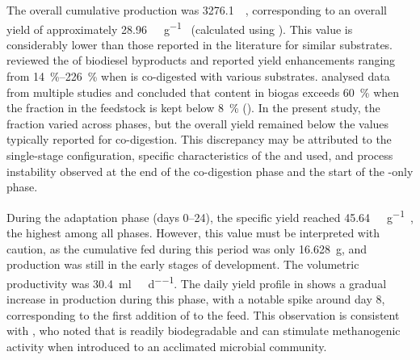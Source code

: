 \documentclass[12pt, a4paper, oneside]{report}
\begin{document}
The overall cumulative  production was \qty[round-mode = places, round-precision = 0]{3276.1}{\nml\CH}, corresponding to an overall yield of approximately \qty[round-mode = places, round-precision = 0]{28.96}{\nml\CH\per\gram\VSfed} (calculated using ). This value is considerably lower than those reported in the literature for similar substrates. \textcite{gebreegziabher2025} reviewed the  of biodiesel byproducts and reported  yield enhancements ranging from \qtyrange{14}{226}{\percent} when  is co-digested with various substrates. \textcite{tomczak2025} analysed data from multiple studies and concluded that  content in biogas exceeds \qty{60}{\percent} when the  fraction in the feedstock is kept below \qty{8}{\percent} (). In the present study, the  fraction varied across phases, but the overall  yield remained below the values typically reported for  co-digestion. This discrepancy may be attributed to the single-stage configuration, specific characteristics of the  and  used, and process instability observed at the end of the co-digestion phase and the start of the -only phase.

During the adaptation phase (days \numrange[parse-numbers=false]{0}{24}), the specific  yield reached \qty{45.64}{\nml\CH\per\gram\VSfed}, the highest among all phases. However, this value must be interpreted with caution, as the cumulative  fed during this period was only \qty{16.628}{\gram}, and  production was still in the early stages of development. The volumetric productivity was \qty{30.4}{\milli\litre\CH\per\reactorlitre\per\day}. The daily yield profile in  shows a gradual increase in  production during this phase, with a notable spike around day \num[parse-numbers=false]{8}, corresponding to the first addition of  to the feed. This observation is consistent with \textcite{gebreegziabher2025}, who noted that  is readily biodegradable and can stimulate methanogenic activity when introduced to an acclimated microbial community.
\end{document}
